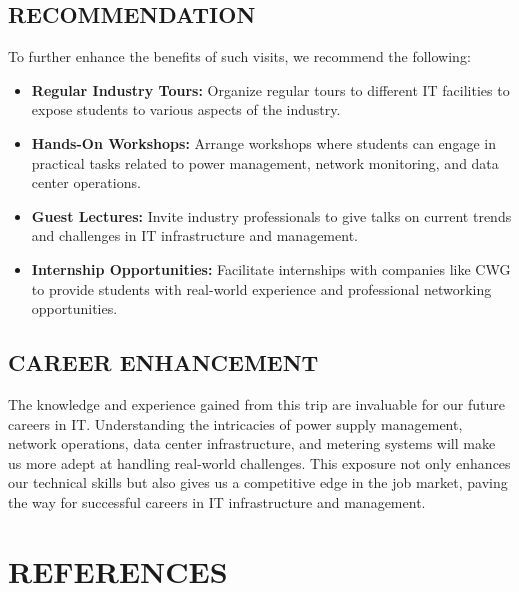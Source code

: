 \documentclass[a4paper,12pt]{report}
\begin{document}
\section[Recommendation]{RECOMMENDATION}
To further enhance the benefits of such visits, we recommend the following:
\begin{itemize}
    \item \textbf{Regular Industry Tours:} Organize regular tours to different IT facilities to expose students to various aspects of the industry.
    \item \textbf{Hands-On Workshops:} Arrange workshops where students can engage in practical tasks related to power management, network monitoring, and data center operations.
    \item \textbf{Guest Lectures:} Invite industry professionals to give talks on current trends and challenges in IT infrastructure and management.
    \item \textbf{Internship Opportunities:} Facilitate internships with companies like CWG to provide students with real-world experience and professional networking opportunities.
\end{itemize}

\section[Career Enhancement]{CAREER ENHANCEMENT}
The knowledge and experience gained from this trip are invaluable for our future careers in IT. Understanding the intricacies of power supply management, network operations, data center infrastructure, and metering systems will make us more adept at handling real-world challenges. This exposure not only enhances our technical skills but also gives us a competitive edge in the job market, paving the way for successful careers in IT infrastructure and management.

\chapter[References]{REFERENCES}
\end{document}
